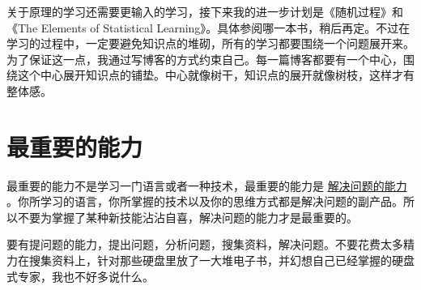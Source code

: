 \documentclass[10pt,a4paper,UTF8]{article}
\begin{document}
关于原理的学习还需要更输入的学习，接下来我的进一步计划是《随机过程》和《The Elements of Statistical Learning》。具体参阅哪一本书，稍后再定。不过在学习的过程中，一定要避免知识点的堆砌，所有的学习都要围绕一个问题展开来。为了保证这一点，我通过写博客的方式约束自己。每一篇博客都要有一个中心，围绕这个中心展开知识点的铺垫。中心就像树干，知识点的展开就像树枝，这样才有整体感。

\section{最重要的能力}
\label{sec:orgdf7eecf}


最重要的能力不是学习一门语言或者一种技术，最重要的能力是 \href{https://www.linkedin.com/pulse/20141113191054-103457178-the-only-skill-you-should-be-concerned-with?trk=mp-reader-card}{解决问题的能力} 。你所学习的语言，你所掌握的技术以及你的思维方式都是解决问题的副产品。所以不要为掌握了某种新技能沾沾自喜，解决问题的能力才是最重要的。

要有提问题的能力，提出问题，分析问题，搜集资料，解决问题。不要花费太多精力在搜集资料上，针对那些硬盘里放了一大堆电子书，并幻想自己已经掌握的硬盘式专家，我也不好多说什么。
\end{document}

